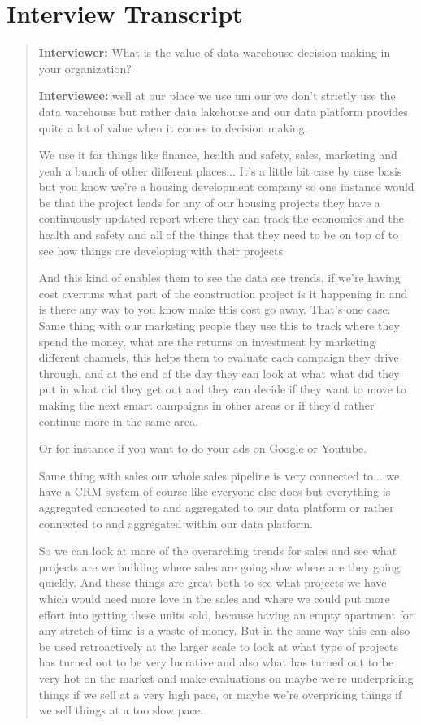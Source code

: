 \newpage

\section{Interview Transcript} \label{sec:interview}
\begin{quote}
    \textbf{Interviewer:} What is the value of data warehouse decision-making in your organization?
    
    \textbf{Interviewee:} well at our place we use um our we don't strictly use the data warehouse but rather data lakehouse and our data platform provides quite a lot of value when it comes to decision making.

    We use it for things like finance, health and safety, sales, marketing and yeah a bunch of other different places... It's a little bit case by case basis but you know we're
    a housing development company so one instance would be that the project leads for any of our housing projects they have a continuously updated report where they can track the economics and the health and safety and all of the things that they need to be on top of to see how things are developing with their projects
    
    And this kind of enables them to see the data see trends, if we're having cost overruns what part of the construction project is it happening in and is there any way to
    you know make this cost go away. That's one case. 
    Same thing with our marketing people they use this to track where they spend the money, what are the returns on investment by marketing different channels, this helps them to evaluate each campaign they drive through, and at the end of the day they can look at what what did they put in what did they get out and they can decide if they want to move to making the next smart campaigns in other areas or if they'd rather continue more in the same area.
    
    Or for instance if you want to do your ads on Google or Youtube.
    
    Same thing with sales our whole sales pipeline is very connected to... we have a CRM system of course like everyone else does but everything is aggregated connected to and aggregated to our data platform or rather connected to and aggregated within our data platform.
    
    So we can look at more of the overarching trends for sales and see what projects are we building where sales are going slow where are they going quickly.
    And these things are great both to see what projects we have which would need more love in the sales and where we could put more effort into getting these units sold, because having an empty apartment for any stretch of time is a waste of money.
    But in the same way this can also be used retroactively at the larger scale to look at what type of projects has turned out to be very lucrative and also what has turned out to be very hot on the market and make evaluations on maybe we're underpricing things if we sell at a very high pace, or maybe we're overpricing things if we sell things at a too slow pace.
    

\end{quote}
